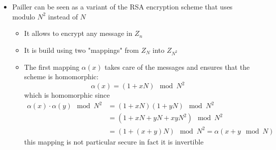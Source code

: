 \begin{itemize}
    \item Pailler can be seen as a variant of the RSA encryption scheme that uses modulo $N^2$ instead of $N$
    \begin{itemize}
        \item It allows to encrypt any message in $Z_n$
        \item It is build using two "mappings" from $Z_N$ into $Z_{N^2}$
        \item The first mapping $\alpha(x)$ takes care of the messages and ensures that the scheme is homomorphic:
        \begin{equation*}
            \alpha(x) = (1+ x N) \mod N^2
        \end{equation*}
        which is homomorphic since
        \begin{align*}
            \alpha(x) \cdot \alpha(y) \mod N^2 &= (1 + xN) (1+ yN) \mod N^2 \\
                                &= (1 + xN + yN + xyN^2) \mod N^2 \\
                                &= (1 + (x + y)N) \mod N^2 = \alpha(x + y \mod N)
        \end{align*}
        this mapping is not particular secure in fact it is invertible 


\end{itemize}
\end{itemize}
